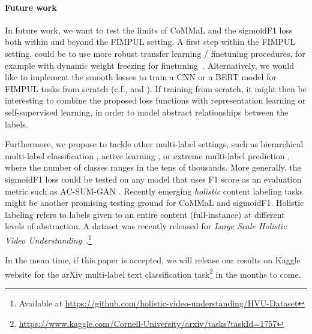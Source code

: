 \paragraph{Future work}
In future work, we want to test the limits of CoMMaL and the sigmoidF1 loss both within and beyond the FIMPUL setting.
%
A first step within the FIMPUL setting, could be to use more robust transfer learning / finetuning procedures, for example with dynamic weight freezing for finetuning~\cite{ULMFit}. Alternatively, we would like to implement the smooth losses to train a CNN or a BERT model for FIMPUL tasks from scratch (c.f., \cite{tencent} and \cite{focalLoss}). If training from scratch, it might then be interesting to combine the proposed loss functions with representation learning \cite{unsupervisedImage,highResRepresentation} or self-supervised learning, in order to model abstract relationships between the labels.

Furthermore, we propose to tackle other multi-label settings, such as hierarchical multi-label classification \cite{HARAM}, active learning \cite{activeLearningMultiLabel}, or extreme multi-label prediction \cite{extremeMultilabelText, extremeSIGIR}, where the number of classes ranges in the tens of thousands. More generally, the sigmoidF1 loss could be tested on any model that uses F1 score as an evaluation metric such as AC-SUM-GAN \cite{AC-SUM-GAN}.
Recently emerging \textit{holistic} content labeling tasks might be another promising testing ground for CoMMaL and sigmoidF1. Holistic labeling refers to labels given to an entire content (full-instance) at different levels of abstraction. A dataset was recently released for \emph{Large Scale Holistic Video Understanding}~\cite{holisticVideoData}.\footnote{Available at \url{https://github.com/holistic-video-understanding/HVU-Dataset}}
\vspace{\baselineskip}

In the mean time, if this paper is accepted, we will release our results on Kaggle website for the arXiv multi-label text classification task\footnote{\url{https://www.kaggle.com/Cornell-University/arxiv/tasks?taskId=1757}} in the months to come.
\fi



